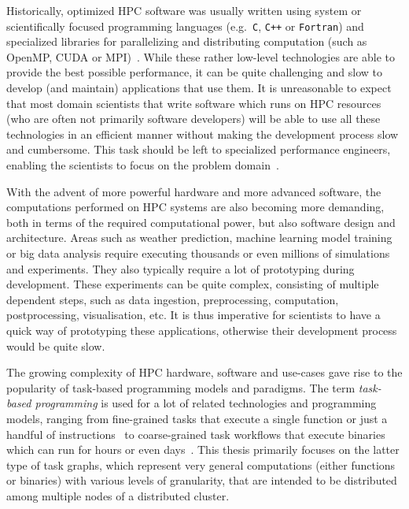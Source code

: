 Historically, optimized HPC software was usually written using system or scientifically focused
programming languages (e.g.~\texttt{C}, \texttt{C++} or
\texttt{Fortran}) and specialized libraries for parallelizing and distributing computation
(such as OpenMP, CUDA or MPI)~\cite{mpistudy}. While these rather low-level technologies are
able to provide the best possible performance, it can be quite challenging and slow to develop (and
maintain) applications that use them. It is unreasonable to expect that most domain scientists that
write software which runs on HPC resources (who are often not primarily software developers) will
be able to use all these technologies in an efficient manner without making the development process
slow and cumbersome. This task should be left to specialized performance engineers, enabling the
scientists to focus on the problem domain~\cite{dace}.

With the advent of more powerful hardware and more advanced software, the computations performed on
HPC systems are also becoming more demanding, both in terms of the required computational power,
but also software design and architecture. Areas such as weather prediction, machine learning model
training or big data analysis require executing thousands or even millions of simulations and
experiments. They also typically require a lot of prototyping during development. These experiments
can be quite complex, consisting of multiple dependent steps, such as data ingestion,
preprocessing, computation, postprocessing, visualisation, etc. It is thus imperative for
scientists to have a quick way of prototyping these applications, otherwise their development
process would be quite slow.

The growing complexity of HPC hardware, software and use-cases gave rise to the popularity of
task-based programming models and paradigms. The term \emph{task-based programming} is used for a lot of
related technologies and programming models, ranging from fine-grained tasks that execute a single
function or just a handful of instructions~\cite{starpu,openmp} to coarse-grained task workflows
that execute binaries which can run for hours or even days~\cite{dask, snakemake, nextflow}. This
thesis primarily focuses on the latter type of task graphs, which represent very general
computations (either functions or binaries) with various levels of granularity,
that are intended to be distributed among multiple nodes of a distributed cluster.

